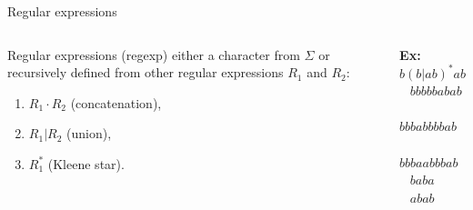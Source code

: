 \begin{frame}{Regular expressions}
    \begin{columns}
        \begin{mydefblock}{Regular expressions (regexp)}
            either a character from $\Sigma$ or recursively defined from other regular expressions $R_1$ and $R_2$:
            \begin{enumerate}
                \item $R_1 \cdot R_2$ (concatenation),
                \item $R_1 | R_2$ (union),
                \item $R_1^\ast$ (Kleene star).
            \end{enumerate}
        \end{mydefblock}
        \pause
        \begin{center}
                \textbf{Ex:} $b(b|ab)^\ast ab$\\
                \smallskip
                \cmark ~ $bbbbbabab$ \\
                \cmark ~ $bbbabbbbab$\\
                \xmark ~ $bbbaabbbab$\\
                \xmark ~ $baba$\\ 
                \xmark ~ $abab$\\
        \end{center}
    \end{columns}    
    \pause


\end{frame}
